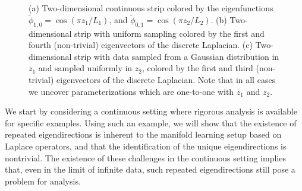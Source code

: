 \documentclass[3p]{elsarticle}
\begin{document}
\begin{figure}[t]
\begin{subfigure}{0.3\textwidth}
\caption{}
\label{subfig:strip_evecs_nonuniform}
\end{subfigure}
%
\caption{(a) Two-dimensional continuous strip colored by the eigenfunctions $\tilde{\phi}_{1, 0} = \cos \left( {\pi z_1}/{L_1} \right)$, and $\tilde{\phi}_{0, 1} = \cos \left( {\pi z_2}/{L_2} \right)$. (b) Two-dimensional strip with uniform sampling colored by the first and fourth (non-trivial) eigenvectors of the discrete Laplacian. (c) Two-dimensional strip with data sampled from a Gaussian distribution in $z_1$ and sampled uniformly in $z_2$, colored by the first and third (non-trivial) eigenvectors of the discrete Laplacian. Note that in all cases we uncover parameterizations which are one-to-one with $z_1$ and $z_2$.}
\end{figure}


We start by considering a continuous setting where rigorous analysis is available for specific examples. 
%
Using such an example, we will show that the existence of repeated eigendirections is inherent to the manifold learning setup based on Laplace operators, and that the identification of the unique eigendirections is nontrivial. 
%
The existence of these challenges in the continuous setting implies that, even in the limit of infinite data, such repeated eigendirections still pose a problem for analysis. 
\end{document}
